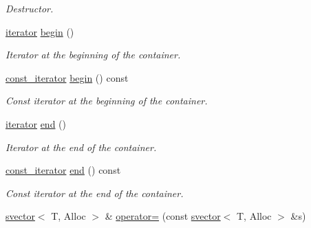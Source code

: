 \begin{DoxyCompactItemize}
\begin{DoxyCompactList}\small\item\em Destructor. \end{DoxyCompactList}\item 
\hyperlink{classlgraph_1_1utils_1_1svector_a518288794e754e27d2e2274ced4485a6}{iterator} \hyperlink{classlgraph_1_1utils_1_1svector_aeb8b316c538de8368b1efdbf7764ac91}{begin} ()
\begin{DoxyCompactList}\small\item\em Iterator at the beginning of the container. \end{DoxyCompactList}\item 
\hyperlink{classlgraph_1_1utils_1_1svector_a50774ce617a742e76f3fb8cc0a7a9445}{const\-\_\-iterator} \hyperlink{classlgraph_1_1utils_1_1svector_a7345683988f337e5015850357ae08714}{begin} () const 
\begin{DoxyCompactList}\small\item\em Const iterator at the beginning of the container. \end{DoxyCompactList}\item 
\hyperlink{classlgraph_1_1utils_1_1svector_a518288794e754e27d2e2274ced4485a6}{iterator} \hyperlink{classlgraph_1_1utils_1_1svector_a07bc452bc6022b65a0399de60b600565}{end} ()
\begin{DoxyCompactList}\small\item\em Iterator at the end of the container. \end{DoxyCompactList}\item 
\hyperlink{classlgraph_1_1utils_1_1svector_a50774ce617a742e76f3fb8cc0a7a9445}{const\-\_\-iterator} \hyperlink{classlgraph_1_1utils_1_1svector_ab315a8270e95e35f27ff99d3bbc67bba}{end} () const 
\begin{DoxyCompactList}\small\item\em Const iterator at the end of the container. \end{DoxyCompactList}\item 
\hypertarget{classlgraph_1_1utils_1_1svector_ad57a44da3d8b2459dbd209d5d8b7a3c9}{\hyperlink{classlgraph_1_1utils_1_1svector}{svector}$<$ T, Alloc $>$ \& \hyperlink{classlgraph_1_1utils_1_1svector_ad57a44da3d8b2459dbd209d5d8b7a3c9}{operator=} (const \hyperlink{classlgraph_1_1utils_1_1svector}{svector}$<$ T, Alloc $>$ \&s)}\label{classlgraph_1_1utils_1_1svector_ad57a44da3d8b2459dbd209d5d8b7a3c9}


\end{DoxyCompactItemize}
